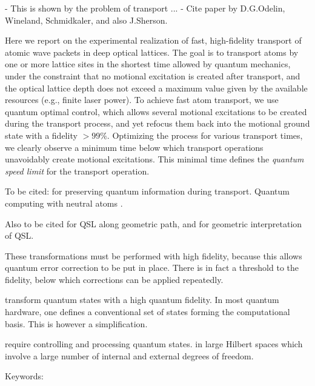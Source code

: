 \documentclass[aps,pra,reprint,a4paper,nofootinbib,superscriptaddress,numbers,longbibliography,showpacs,showkeys,floatfix]{revtex4-1}
\begin{document}
- This is shown by the problem of transport ...
%
- Cite paper by D.G.Odelin, Wineland, Schmidkaler, and also J.Sherson.




Here we report on the experimental realization of fast, high-fidelity transport of atomic wave packets in deep optical lattices.
%
The goal is to transport atoms by one or more lattice sites in the shortest time allowed by quantum mechanics, under the constraint that no motional excitation is created after transport, and
the optical lattice depth does not exceed a maximum value given by the available resources (e.g., finite laser power).
%
To achieve fast atom transport, we use quantum optimal control, which allows several motional excitations to be created during the transport process, and yet refocus them back into the motional ground state with a fidelity $>99\%$.
%
Optimizing the process for various transport times, we clearly observe a minimum time below which transport operations unavoidably create motional excitations.
%
This minimal time defines the \emph{quantum speed limit} for the transport operation. 



To be cited: \cite{Kaufmann:2018} for preserving quantum information during transport. Quantum computing with neutral atoms \cite{Weiss:2017}.

Also to be cited \cite{Bukov:2019} for QSL along geometric path, and \cite{Anandan:1990} for geometric interpretation of QSL. 



These transformations must be performed with high fidelity, because this allows quantum error correction to be put in place.
%
There is in fact a threshold to the fidelity, below which corrections can be applied repeatedly.
%





 transform quantum states with a high quantum fidelity.
%
In most quantum hardware, one defines a conventional set of states forming the computational basis.
%
This is however a simplification.


  

require controlling and processing quantum states. in large Hilbert spaces which involve a large number of internal and external degrees of freedom.




\vspace{3mm}

Keywords:
\end{document}
